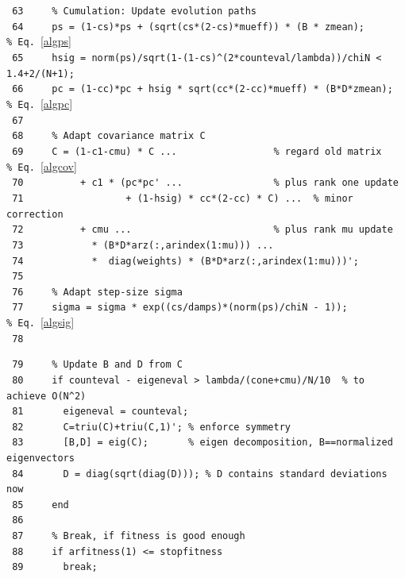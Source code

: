 \documentclass{article} %
\newcommand{\tabverb}{\hspace*{0.0ex}\verb}
\begin{document}
\begin{appendix}
\begin{scriptsize}
\tabverb| 63     %
\tabverb| 64     ps = (1-cs)*ps + (sqrt(cs*(2-cs)*mueff)) * (B * zmean);            %
\tabverb| 65     hsig = norm(ps)/sqrt(1-(1-cs)^(2*counteval/lambda))/chiN < 1.4+2/(N+1);  |\\
\tabverb| 66     pc = (1-cc)*pc + hsig * sqrt(cc*(2-cc)*mueff) * (B*D*zmean);       %
\tabverb| 67                                                                          |\\
\tabverb| 68     %
\tabverb| 69     C = (1-c1-cmu) * C ...                 %
\tabverb| 70          + c1 * (pc*pc' ...                %
\tabverb| 71                  + (1-hsig) * cc*(2-cc) * C) ...  %
\tabverb| 72          + cmu ...                         %
\tabverb| 73            * (B*D*arz(:,arindex(1:mu))) ...                              |\\
\tabverb| 74            *  diag(weights) * (B*D*arz(:,arindex(1:mu)))';               |\\
\tabverb| 75                                                                          |\\
\tabverb| 76     %
\tabverb| 77     sigma = sigma * exp((cs/damps)*(norm(ps)/chiN - 1));               %
\tabverb| 78 |\\[-5.33ex] 
\begin{verbatim}
 79     % Update B and D from C
 80     if counteval - eigeneval > lambda/(cone+cmu)/N/10  % to achieve O(N^2)
 81       eigeneval = counteval;
 82       C=triu(C)+triu(C,1)'; % enforce symmetry
 83       [B,D] = eig(C);       % eigen decomposition, B==normalized eigenvectors
 84       D = diag(sqrt(diag(D))); % D contains standard deviations now
 85     end
 86 
 87     % Break, if fitness is good enough
 88     if arfitness(1) <= stopfitness 
 89       break;

\end{verbatim}
\end{scriptsize}
\end{appendix}
\end{document}
